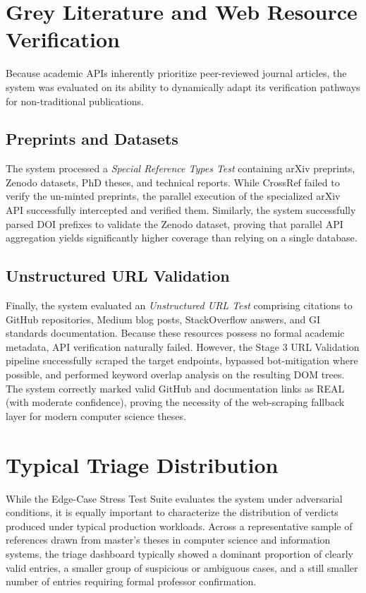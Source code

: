 \documentclass[12pt,a4paper,oneside]{report}
\begin{document}
\section{Grey Literature and Web Resource Verification}

Because academic APIs inherently prioritize peer-reviewed journal articles, the system was evaluated on its ability to dynamically adapt its verification pathways for non-traditional publications.

\subsection{Preprints and Datasets}
The system processed a \textit{Special Reference Types Test} containing arXiv preprints, Zenodo datasets, PhD theses, and technical reports. While CrossRef failed to verify the un-minted preprints, the parallel execution of the specialized arXiv API successfully intercepted and verified them. Similarly, the system successfully parsed DOI prefixes to validate the Zenodo dataset, proving that parallel API aggregation yields significantly higher coverage than relying on a single database.

\subsection{Unstructured URL Validation}
Finally, the system evaluated an \textit{Unstructured URL Test} comprising citations to GitHub repositories, Medium blog posts, StackOverflow answers, and GI standards documentation. Because these resources possess no formal academic metadata, API verification naturally failed. However, the Stage 3 URL Validation pipeline successfully scraped the target endpoints, bypassed bot-mitigation where possible, and performed keyword overlap analysis on the resulting DOM trees. The system correctly marked valid GitHub and documentation links as REAL (with moderate confidence), proving the necessity of the web-scraping fallback layer for modern computer science theses.

\section{Typical Triage Distribution}

While the Edge-Case Stress Test Suite evaluates the system under adversarial conditions, it is equally important to characterize the distribution of verdicts produced under typical production workloads. Across a representative sample of references drawn from master's theses in computer science and information systems, the triage dashboard typically showed a dominant proportion of clearly valid entries, a smaller group of suspicious or ambiguous cases, and a still smaller number of entries requiring formal professor confirmation.
\end{document}

